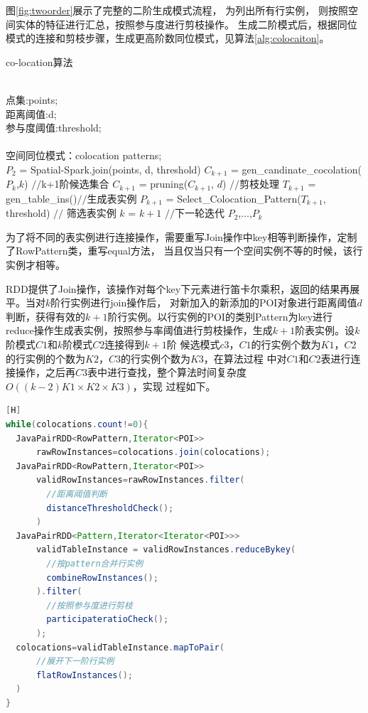 图\ref{fig:twoorder}展示了完整的二阶生成模式流程，
\uppercase\expandafter{}为列出所有行实例，\uppercase\expandafter{}
则按照空间实体的特征进行汇总，按照参与度进行剪枝操作。
生成二阶模式后，根据同位模式的连接和剪枝步骤，生成更高阶数同位模式，见算法\ref{alg:colocaiton}。
\begin{algorithm}
\caption{co-location算法}
\label{alg:colocaiton}
\begin{algorithmic}[1]   
\REQUIRE  ~~\\  
点集:points;\\  
距离阈值:d;\\
参与度阈值:threshold;\\  
\ENSURE ~~\\  
空间同位模式：colocation patterns; \\
\STATE $P_2$ = Spatial-Spark.join(points, d, threshold)
\STATE $C_{k+1}$ = gen\_candinate\_cocolation($P_k$,$k$) $//$k+1阶候选集合
\STATE $C_{k+1}$ = pruning($C_{k+1}$, $d$) $//$剪枝处理
\STATE $T_{k+1}$ = gen\_table\_ins()$//$生成表实例
\STATE $P_{k+1}$ = Select\_Colocation\_Pattern($T_{k+1}$, threshold) $//$ 筛选表实例
\STATE $k$ = $k+1$ $//$下一轮迭代
\ENDWHILE 
\RETURN $P_2$,$\dots$,$P_k$
\end{algorithmic}  
\end{algorithm}

为了将不同的表实例进行连接操作，需要重写Join操作中key相等判断操作，定制了RowPattern类，重写equal方法，
当且仅当只有一个空间实例不等的时候，该行实例才相等。

RDD提供了Join操作，该操作对每个key下元素进行笛卡尔乘积，返回的结果再展平。当对$k$阶行实例进行join操作后，
对新加入的新添加的POI对象进行距离阈值$d$判断，获得有效的$k+1$阶行实例。以行实例的POI的类别Pattern为key进行
reduce操作生成表实例，按照参与率阈值进行剪枝操作，生成$k+1$阶表实例。设$k$阶模式$C1$和$k$阶模式$C2$连接得到$k+1$阶
候选模式$c3$，$C1$的行实例个数为$K1$，$C2$的行实例的个数为$K2$，$C3$的行实例个数为$K3$，在算法过程
中对$C1$和$C2$表进行连接操作，之后再$C3$表中进行查找，整个算法时间复杂度$O((k-2)K1\times K2 \times K3)$，实现
过程如下。
\begin{lstlisting}[language=Java][H]
while(colocations.count!=0){
  JavaPairRDD<RowPattern,Iterator<POI>> 
      rawRowInstances=colocations.join(colocations);
  JavaPairRDD<RowPattern,Iterator<POI>>
      validRowInstances=rawRowInstances.filter(
        //距离阈值判断
        distanceThresholdCheck();
      )
  JavaPairRDD<Pattern,Iterator<Iterator<POI>>>
      validTableInstance = validRowInstances.reduceBykey(
        //按pattern合并行实例
        combineRowInstances();       
      ).filter(
        //按照参与度进行剪枝
        participateratioCheck();
      );
  colocations=validTableInstance.mapToPair(
      //展开下一阶行实例
      flatRowInstances();
  )
}
\end{lstlisting}


